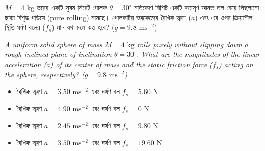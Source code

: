 \documentclass[12pt, a4paper]{article}
\begin{document}
\begin{tcolorbox}[questionbox={প্রশ্ন (Question) 41}]
\noindent
$M = 4\text{ kg}$ ভরের একটি সুষম নিরেট গোলক $\theta = 30^\circ$ নতিকোণ বিশিষ্ট একটি অমসৃণ আনত তল বেয়ে পিছলানো ছাড়া বিশুদ্ধ গড়িয়ে (pure rolling) নামছে। গোলকটির ভরকেন্দ্রের রৈখিক ত্বরণ ($a$) এবং এর ওপর ক্রিয়াশীল স্থিতি ঘর্ষণ বলের ($f_s$) মান যথাক্রমে কত হবে? ($g = 9.8\text{ ms}^{-2}$)

\vspace{0.8em}
\begin{english}
\noindent\textit{\color{darkgray}
A uniform solid sphere of mass $M = 4\text{ kg}$ rolls purely without slipping down a rough inclined plane of inclination $\theta = 30^\circ$. What are the magnitudes of the linear acceleration ($a$) of its center of mass and the static friction force ($f_s$) acting on the sphere, respectively? ($g = 9.8\text{ ms}^{-2}$)
}
\end{english}
\end{tcolorbox}

\vspace{1em}
\begin{center}
\end{center}
\vspace{1em}

\begin{itemize}[label={}, leftmargin=1cm, itemsep=0.5em]
\item[\textbf{A)}] রৈখিক ত্বরণ $a = 3.50\text{ ms}^{-2}$ এবং ঘর্ষণ বল $f_s = 5.60\text{ N}$
\item[\textbf{B)}] রৈখিক ত্বরণ $a = 4.90\text{ ms}^{-2}$ এবং ঘর্ষণ বল $f_s = 0\text{ N}$
\item[\textbf{C)}] রৈখিক ত্বরণ $a = 2.45\text{ ms}^{-2}$ এবং ঘর্ষণ বল $f_s = 9.80\text{ N}$
\item[\textbf{D)}] রৈখিক ত্বরণ $a = 3.50\text{ ms}^{-2}$ এবং ঘর্ষণ বল $f_s = 19.60\text{ N}$
\end{itemize}
\end{document}
